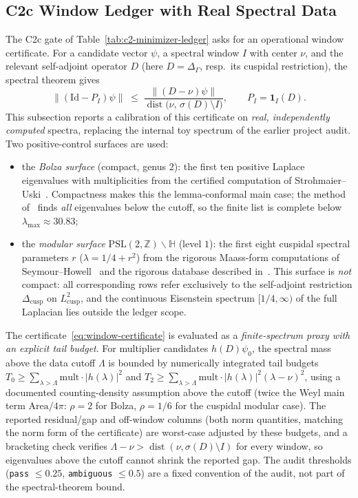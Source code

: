 \documentclass[12pt,a4paper]{article}
\theoremstyle{definition}
\theoremstyle{remark}
\newcommand{\HH}{\mathbb{H}}
\newcommand{\ZZ}{\mathbb{Z}}
\newcommand{\Delop}{\Delta_{\Gamma}}
\begin{document}
\subsection{C2c Window Ledger with Real Spectral Data}
\label{sec:c2c-real-ledger}

The C2c gate of Table~\ref{tab:c2-minimizer-ledger} asks for an operational
window certificate. For a candidate vector $\psi$, a spectral window $I$
with center $\nu$, and the relevant self-adjoint operator $D$ (here
$D=\Delop$, resp.\ its cuspidal restriction), the spectral theorem gives
\begin{equation}
\label{eq:window-certificate}
\|(\mathrm{Id}-P_I)\psi\| \;\le\;
\frac{\|(D-\nu)\psi\|}{\operatorname{dist}\bigl(\nu,\,\sigma(D)\setminus I\bigr)},
\qquad P_I = \mathbf{1}_I(D).
\end{equation}
This subsection reports a calibration of this certificate on \emph{real,
independently computed} spectra, replacing the internal toy spectrum of the
earlier project audit. Two positive-control surfaces are used:
\begin{itemize}
\item the \emph{Bolza surface} (compact, genus $2$): the first ten positive
Laplace eigenvalues with multiplicities from the certified computation of
Strohmaier--Uski~\cite{StrohmaierUski2013}. Compactness makes this the
lemma-conformal main case; the method of~\cite{StrohmaierUski2013} finds
\emph{all} eigenvalues below the cutoff, so the finite list is complete below
$\lambda_{\max}\approx 30.83$;
\item the \emph{modular surface} $\mathrm{PSL}(2,\ZZ)\backslash\HH$
(level $1$): the first eight cuspidal spectral parameters $r$
($\lambda = 1/4 + r^2$) from the rigorous Maass-form computations of
Seymour--Howell~\cite{SeymourHowell2022} and the rigorous database described
in~\cite{LowryDuda2025}. This surface is \emph{not} compact: all
corresponding rows refer exclusively to the self-adjoint restriction
$\Delta_{\mathrm{cusp}}$ on $L^2_{\mathrm{cusp}}$, and the continuous
Eisenstein spectrum $[1/4,\infty)$ of the full Laplacian lies outside the
ledger scope.
\end{itemize}

The certificate~\eqref{eq:window-certificate} is evaluated as a
\emph{finite-spectrum proxy with an explicit tail budget}. For multiplier
candidates $h(D)\psi_0$, the spectral mass above the data cutoff $\Lambda$
is bounded by numerically integrated tail budgets
$T_0 \ge \sum_{\lambda>\Lambda}\mathrm{mult}\cdot|h(\lambda)|^2$ and
$T_2 \ge \sum_{\lambda>\Lambda}\mathrm{mult}\cdot|h(\lambda)|^2(\lambda-\nu)^2$,
using a documented counting-density assumption above the cutoff (twice the
Weyl main term $\mathrm{Area}/4\pi$: $\rho=2$ for Bolza, $\rho=1/6$ for the
cuspidal modular case). The reported residual/gap and off-window columns
(both norm quantities, matching the norm form of the certificate) are
worst-case adjusted by these budgets, and a bracketing check verifies
$\Lambda-\nu > \operatorname{dist}(\nu,\sigma(D)\setminus I)$ for every
window, so eigenvalues above the cutoff cannot shrink the reported gap. The
audit thresholds (\texttt{pass} $\le 0.25$, \texttt{ambiguous} $\le 0.5$) are
a fixed convention of the audit, not part of the spectral-theorem bound.
\end{document}
